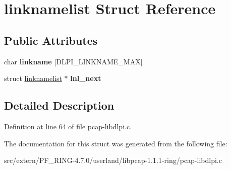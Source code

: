 \hypertarget{structlinknamelist}{
\section{linknamelist Struct Reference}
\label{structlinknamelist}
}
\subsection*{Public Attributes}
\begin{DoxyCompactItemize}
\item 
\hypertarget{structlinknamelist_a3fd7ccd28ec5145a7eb2e3818a2c0f89}{
char {\bfseries linkname} \mbox{[}DLPI\_\-LINKNAME\_\-MAX\mbox{]}}
\label{structlinknamelist_a3fd7ccd28ec5145a7eb2e3818a2c0f89}

\item 
\hypertarget{structlinknamelist_a6f319cbc787f533a4251633be77692cc}{
struct \hyperlink{structlinknamelist}{linknamelist} $\ast$ {\bfseries lnl\_\-next}}
\label{structlinknamelist_a6f319cbc787f533a4251633be77692cc}

\end{DoxyCompactItemize}


\subsection{Detailed Description}


Definition at line 64 of file pcap-\/libdlpi.c.



The documentation for this struct was generated from the following file:\begin{DoxyCompactItemize}
\item 
src/extern/PF\_\-RING-\/4.7.0/userland/libpcap-\/1.1.1-\/ring/pcap-\/libdlpi.c\end{DoxyCompactItemize}
